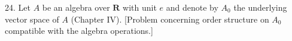 24. Let $A$ be an algebra over $\mathbf{R}$ with unit $e$ and denote by $A_0$ the underlying vector space of $A$ (Chapter IV). [Problem concerning order structure on $A_0$ compatible with the algebra operations.]
